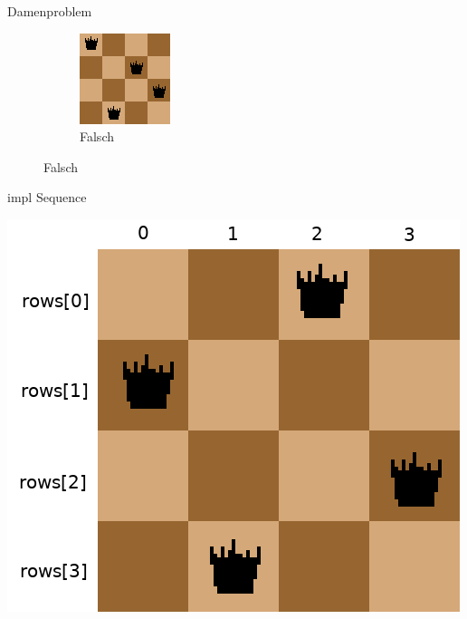 \documentclass[aspectratio=43,t]{beamer}
\begin{document}
\begin{frame}{Damenproblem}
\begin{figure}[h!]
\begin{subfigure}{0.4\linewidth}
          \includegraphics[width=\linewidth]{../img/queensWrong.png}
          \caption{Falsch}
        \end{subfigure}
        \label{n4}
      \end{figure}
    \end{frame}
    \begin{frame}{impl Sequence}
      \begin{center}
        \includegraphics[width=\textwidth,height=0.8\textheight,keepaspectratio]{../img/q4.png}
      \end{center}
    \end{frame}
\end{document}
